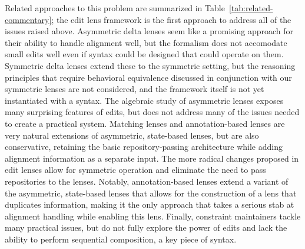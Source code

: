 Related approaches to this problem are summarized in
Table~\ref{tab:related-commentary}; the edit lens framework is the first
approach to address all of the issues raised above. Asymmetric delta lenses
seem like a promising approach for their ability to handle alignment well,
but the formalism does not accomodate small edits well even if syntax could
be designed that could operate on them. Symmetric delta lenses extend these
to the symmetric setting, but the reasoning principles that require
behavioral equivalence discussed in conjunction with our symmetric lenses
are not considered, and the framework itself is not yet instantiated with a
syntax. The algebraic study of asymmetric lenses exposes many surprising
features of edits, but does not address many of the issues needed to create
a practical system. Matching lenses and annotation-based lenses are very
natural extensions of asymmetric, state-based lenses, but are also
conservative, retaining the basic repository-passing architecture while
adding alignment information as a separate input. The more radical changes
proposed in edit lenses
allow for symmetric operation and eliminate the need to pass repositories to
the lenses. Notably, annotation-based lenses extend a variant of the
asymmetric, state-based lenses that allows for the construction of a lens
that duplicates information, making it the only approach that takes a
serious stab at alignment handling while enabling this lens. Finally,
constraint maintainers tackle many practical issues, but do not fully
explore the power of edits and lack the ability to perform sequential
composition, a key piece of syntax.


